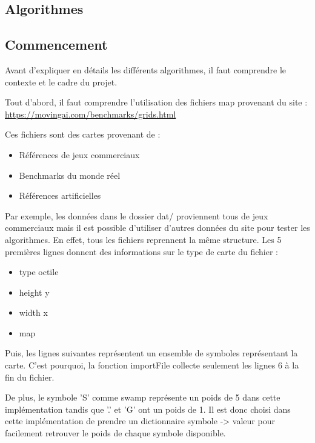 \documentclass[a4paper,12pt]{article}
\begin{document}
\newpage

\begin{center}
\huge\section*{Algorithmes}
\end{center}

\subsection{Commencement}

Avant d'expliquer en détails les différents algorithmes, il faut comprendre le contexte et le cadre du projet.
\newline

Tout d'abord, il faut comprendre l'utilisation des fichiers map provenant du site : \url{https://movingai.com/benchmarks/grids.html}
\newline

Ces fichiers sont des cartes provenant de :
\begin{itemize}
  \item Références de jeux commerciaux
  \item Benchmarks du monde réel
  \item Références artificielles
\end{itemize}
Par exemple, les données dans le dossier dat/ proviennent tous de jeux commerciaux mais il est possible d'utiliser d'autres données du site pour tester les algorithmes.
En effet, tous les fichiers reprennent la même structure. Les 5 premières lignes donnent des informations sur le type de carte du fichier :
\begin{itemize}
  \item[] type octile
  \item[] height y
  \item[] width x
  \item[] map
\end{itemize}
Puis, les lignes suivantes représentent un ensemble de symboles représentant la carte. C'est pourquoi, la fonction importFile collecte seulement les lignes 6 à la fin du fichier.
\newline

De plus, le symbole 'S' comme swamp représente un poids de 5 dans cette implémentation tandis que '.' et 'G' ont un poids de 1. Il est donc choisi dans cette implémentation de prendre un dictionnaire symbole -> valeur pour facilement retrouver le poids de chaque symbole disponible.
\newline
\end{document}
